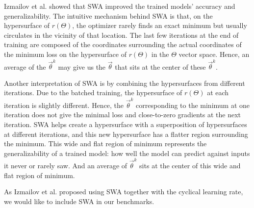 Izmailov et al. \cite{izmailov_averaging_2019} showed that SWA improved the trained models' accuracy and generalizability.
The intuitive mechanism behind SWA is that, on the hypersurface of $r(\Theta)$, the optimizer rarely finds an exact minimum but usually circulates in the vicinity of that location.
The last few iterations at the end of training are composed of the coordinates surrounding the actual coordinates of the minimum loss on the hypersurface of $r(\Theta)$ in the $\Theta$ vector space.
Hence, an average of the $\vec{\theta}^k$ may give us the $\vec{\theta}$ that sits at the center of these $\vec{\theta}^k$.

Another interpretation of SWA is by combining the hypersurfaces from different iterations.
Due to the batched training, the hypersurface of $r(\Theta)$ at each iteration is slightly different.
Hence, the $\vec{\theta}^k$ corresponding to the minimum at one iteration does not give the minimal loss and close-to-zero gradients at the next iteration.
SWA helps create a hypersurface with a superposition of hypersurfaces at different iterations, and this new hypersurface has a flatter region surrounding the minimum.
This wide and flat region of minimum represents the generalizability of a trained model: how well the model can predict against inputs it never or rarely saw.
And an average of $\vec{\theta}^k$ sits at the center of this wide and flat region of minimum.

As Izmailov et al. proposed using SWA together with the cyclical learning rate, we would like to include SWA in our benchmarks.
